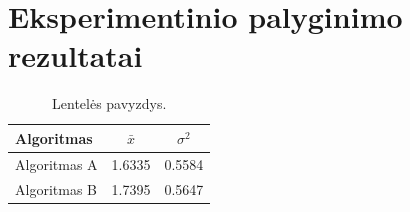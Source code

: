 \documentclass{VUMIFPSkursinis}
\begin{document}
\section{Eksperimentinio palyginimo rezultatai}
\begin{table}[H]\footnotesize
  \centering
  \caption{Lentelės pavyzdys.}
  {\begin{tabular}{|l|c|c|} \hline
    Algoritmas & $\bar{x}$ & $\sigma^{2}$ \\
    \hline
    Algoritmas A  & 1.6335    & 0.5584       \\
    Algoritmas B  & 1.7395    & 0.5647       \\
    \hline
  \end{tabular}}
  \label{tab:table example}
\end{table}
\end{document}
